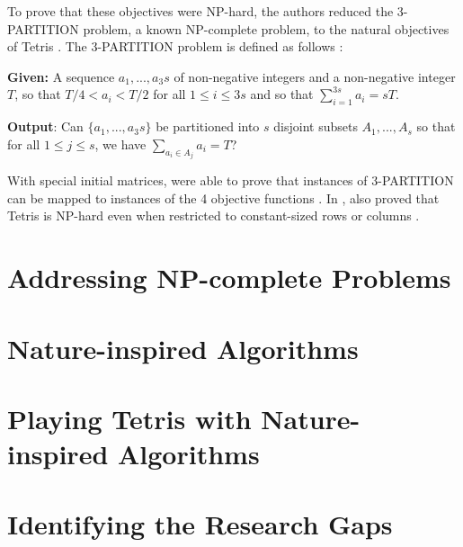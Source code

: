 \documentclass[a4paper, 12pt]{extreport}
\begin{document}
				To prove that these objectives were NP-hard, the authors reduced the 3-PARTITION problem, a known NP-complete problem, to the natural objectives of Tetris \cite{tetris-is-hard-even-to-approx}. The 3-PARTITION problem is defined as follows \cite{tetris-is-hard-even-to-approx}:
				
				\noindent \textbf{Given:} A sequence $a_1,...,a_3s$ of non-negative integers and a non-negative integer $T$, so that $T/4 < a_i < T/2$ for all $1 \le i \le 3s$ and so that $\sum_{i=1}^{3s}a_i = sT$.
				
				\noindent \textbf{Output}: Can $\{a_1,...,a_3s\}$ be partitioned into $s$ disjoint subsets $A_1,...,A_s$ so that for all $1 \le j \le s$, we have $\sum_{a_i \in A_j}a_i = T$?
				
				With special initial matrices, \citeauthor{tetris-is-hard-even-to-approx} were able to prove that instances of 3-PARTITION can be mapped to instances of the 4 objective functions \cite{tetris-is-hard-even-to-approx}. In \citeyear{tetris-o1-np-hard}, \citeauthor{tetris-o1-np-hard} also proved that Tetris is NP-hard even when restricted to constant-sized rows or columns \cite{tetris-o1-np-hard}.
			
		\section{Addressing NP-complete Problems}
		
		
		\section{Nature-inspired Algorithms}
		
		
		\section{Playing Tetris with Nature-inspired Algorithms}
		
		
		\section{Identifying the Research Gaps}
		
\end{document}
